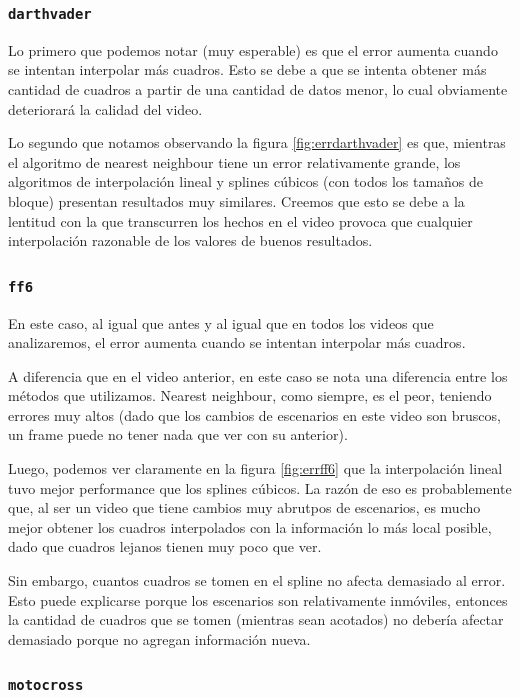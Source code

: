 \subsubsection{\texttt{darthvader}}

Lo primero que podemos notar (muy esperable) es que el error aumenta cuando se intentan interpolar más cuadros. Esto se debe a que se intenta obtener más cantidad de cuadros a partir de una cantidad de datos menor, lo cual obviamente deteriorará la calidad del video.

Lo segundo que notamos observando la figura \ref{fig:errdarthvader} es que, mientras el algoritmo de nearest neighbour tiene un error relativamente grande, los algoritmos de interpolación lineal y splines cúbicos (con todos los tamaños de bloque) presentan resultados muy similares. 
Creemos que esto se debe a la lentitud con la que transcurren los hechos en el video provoca que cualquier interpolación razonable de los valores de buenos resultados. 


\subsubsection{\texttt{ff6}}

En este caso, al igual que antes y al igual que en todos los videos que analizaremos, el error aumenta cuando se intentan interpolar más cuadros.

A diferencia que en el video anterior, en este caso se nota una diferencia entre los m\'etodos que utilizamos. Nearest neighbour, como siempre, es el peor, teniendo errores muy altos (dado que los cambios de escenarios en este video son bruscos, un frame puede no tener nada que ver con su anterior).


Luego, podemos ver claramente en la figura \ref{fig:errff6} que la interpolación lineal tuvo mejor performance que los splines cúbicos. La razón de eso es probablemente que, al ser un video que tiene cambios muy abrutpos de escenarios, es mucho mejor obtener los cuadros interpolados con la información lo más local posible, dado que cuadros lejanos tienen muy poco que ver.

Sin embargo, cuantos cuadros se tomen en el spline no afecta demasiado al error. Esto puede explicarse porque los escenarios son relativamente inmóviles, entonces la cantidad de cuadros que se tomen (mientras sean acotados) no debería afectar demasiado porque no agregan información nueva.

\subsubsection{\texttt{motocross}}

